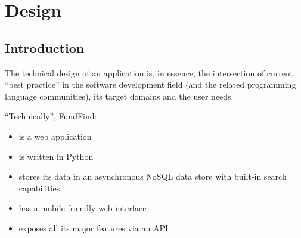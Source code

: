 \chapter{Design}





\section{Introduction}
The technical design of an application is, in essence, the intersection of current ``best practice'' in the software development field (and the related programming language communities), its target domains and the user needs.

``Technically'', FundFind:
\begin{itemize}
 \item is a web application
 \item is written in Python
 \item stores its data in an asynchronous NoSQL data store with built-in search capabilities
 \item has a mobile-friendly web interface
 \item exposes all its major features via an API
\end{itemize}

